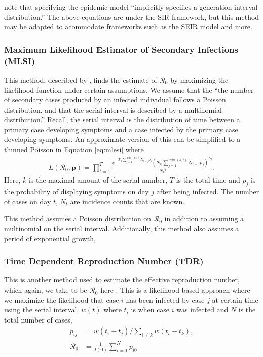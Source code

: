 \documentclass[12pt]{article}
\newcommand{\rr}{\ensuremath{\mathcal{R}_0}}
\begin{document}
\citeauthor{wallinga2007generation} note that specifying the epidemic model ``implicitly specifies a generation interval distribution.''  The above equations are under the SIR framework, but this method may be adapted to acommodate frameworks such as the SEIR model and more.

\subsubsection{Maximum Likelihood Estimator of Secondary Infections (MLSI)}\label{sec:mle-si}
This method, described by \cite{forsberg2008}, finds the estimate of $\rr$ by maximizing the likelihood function under certain assumptions.  We assume that the ``the number of secondary cases produced by an infected individual follows a Poisson distribution, and that the serial interval is described by a multinomial distribution.''  Recall, the serial interval is the distribution of time between a primary case developing symptoms and a case infected by the primary case developing symptoms.  An approximate version of this can be simplified to a thinned Poisson in Equation \ref{eq:mlesi} where
\begin{align}\label{eq:mlesi}
  L(\rr, \mathbf{p}) = \prod_{t=1}^T \frac{e^{- \rr \sum_{j=1}^{\min(k,t)}N_{t-j}p_j}\left (\rr \sum_{j=1}^{\min(k,t)}N_{t-j}p_j \right )^{N_t}}{N_t!}.
\end{align}
Here, $k$ is the maximal amount of the serial number, $T$ is the total time and $p_j$ is the probability of displaying symptoms on day $j$ after being infected.  The number of cases on day $t$, $N_t$ are incidence counts that are known. 

This method assumes a Poisson distribution on $\rr$ in addition to assuming a multinomial on the serial interval.  Additionally, this method also assumes a period of exponential growth,



\subsubsection{Time Dependent Reproduction Number (TDR)}\label{sec:timedep}
This is another method used to estimate the effective reproduction number, which again, we take to be $\rr$ here \citep{forsberg2008}.  This is a likelihood based approach where we maximize the likelihood that case $i$ has been infected by case $j$ at certain time using the serial interval, $w(t)$ where $t_i$ is when case $i$ was infected and $N$ is the total number of cases,
\begin{align*}
  p_{ij} &= w(t_i- t_j) / \sum_{i \neq k} w(t_i - t_k),\\
  \rr &= \frac{1}{I(0)}\sum_{i=1}^N p_{i0}
  \end{align*}
\end{document}

